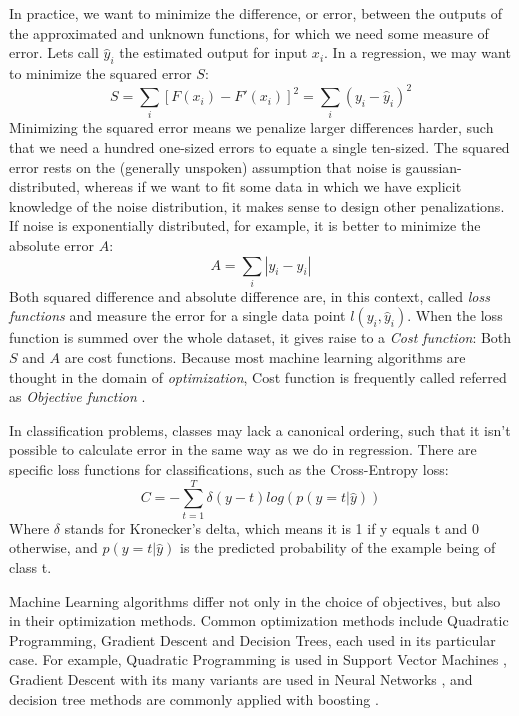     In practice, we want to minimize the difference, or error, between the outputs of the approximated and unknown functions, for which we need some measure of error. Lets call $\hat{y}_i$ the estimated output for input $x_i$. In a regression, we may want to minimize the squared error $S$:
    $$ S = \sum_i [F(x_i)-F'(x_i)]^2 = \sum_i (y_i-\hat{y}_i)^2 $$
    Minimizing the squared error means we penalize larger differences harder, such that we need a hundred one-sized errors to equate a single ten-sized. The squared error rests on the (generally unspoken) assumption that noise is gaussian-distributed, whereas if we want to fit some data in which we have explicit knowledge of the noise distribution, it makes sense to design other penalizations. If noise is exponentially distributed, for example, it is better to minimize the absolute error $A$:
    $$ A = \sum_i |y_i-\hat{y}_i| $$
    Both squared difference and absolute difference are, in this context, called \textit{loss functions} and measure the error for a single data point $l(y_i, \hat{y}_i)$. When the loss function is summed over the whole dataset, it gives raise to a \textit{Cost function}: Both $S$ and $A$ are cost functions. Because most machine learning algorithms are thought in the domain of \textit{optimization}, Cost function is frequently called referred as \textit{Objective function} \cite[p~79]{goodfellow2016deep}.
    
    In classification problems, classes may lack a canonical ordering, such that it isn't possible to calculate error in the same way as we do in regression. There are specific loss functions for classifications, such as the Cross-Entropy loss:
    \begin{equation}
        C = -\sum_{t=1}^{T}\delta(y-t)log(p(y=t|\hat{y}))
    \end{equation}
    Where $\delta$ stands for Kronecker's delta, which means it is 1 if y equals t and 0 otherwise, and $p(y=t|\hat{y})$ is the predicted probability of the example being of class t.
    
    Machine Learning algorithms differ not only in the choice of objectives, but also in their optimization methods. Common optimization methods include Quadratic Programming, Gradient Descent and Decision Trees, each used in its particular case. For example, Quadratic Programming is used in Support Vector Machines \cite{chang2011libsvm}, Gradient Descent with its many variants are used in Neural Networks \cite{ruder2016overview}, and decision tree methods are commonly applied with boosting \cite{chen2016xgboost}.

